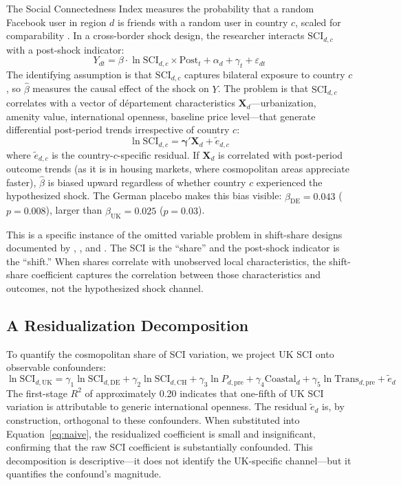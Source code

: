 \documentclass[12pt]{article}
\begin{document}
The Social Connectedness Index measures the probability that a random Facebook user in region $d$ is friends with a random user in country $c$, scaled for comparability \citep{bailey2018social}. In a cross-border shock design, the researcher interacts $\text{SCI}_{d,c}$ with a post-shock indicator:
\begin{equation}\label{eq:naive}
Y_{dt} = \beta \cdot \ln\text{SCI}_{d,c} \times \text{Post}_t + \alpha_d + \gamma_t + \varepsilon_{dt}
\end{equation}
The identifying assumption is that $\text{SCI}_{d,c}$ captures bilateral exposure to country $c$, so $\hat{\beta}$ measures the causal effect of the shock on $Y$. The problem is that $\text{SCI}_{d,c}$ correlates with a vector of d\'epartement characteristics $\mathbf{X}_d$---urbanization, amenity value, international openness, baseline price level---that generate differential post-period trends irrespective of country $c$:
\[
\ln\text{SCI}_{d,c} = \boldsymbol{\gamma}' \mathbf{X}_d + \tilde{e}_{d,c}
\]
where $\tilde{e}_{d,c}$ is the country-$c$-specific residual. If $\mathbf{X}_d$ is correlated with post-period outcome trends (as it is in housing markets, where cosmopolitan areas appreciate faster), $\hat{\beta}$ is biased upward regardless of whether country $c$ experienced the hypothesized shock. The German placebo makes this bias visible: $\hat{\beta}_{\text{DE}} = 0.043$ ($p = 0.008$), larger than $\hat{\beta}_{\text{UK}} = 0.025$ ($p = 0.03$).

This is a specific instance of the omitted variable problem in shift-share designs documented by \citet{borusyak2022quasi}, \citet{goldsmith2020bartik}, and \citet{adao2019shift}. The SCI is the ``share'' and the post-shock indicator is the ``shift.'' When shares correlate with unobserved local characteristics, the shift-share coefficient captures the correlation between those characteristics and outcomes, not the hypothesized shock channel.

\subsection{A Residualization Decomposition}

To quantify the cosmopolitan share of SCI variation, we project UK SCI onto observable confounders:
\[
\ln\text{SCI}_{d,\text{UK}} = \gamma_1 \ln\text{SCI}_{d,\text{DE}} + \gamma_2 \ln\text{SCI}_{d,\text{CH}} + \gamma_3 \ln P_{d,\text{pre}} + \gamma_4 \text{Coastal}_d + \gamma_5 \ln \text{Trans}_{d,\text{pre}} + \tilde{e}_d
\]
The first-stage $R^2$ of approximately 0.20 indicates that one-fifth of UK SCI variation is attributable to generic international openness. The residual $\tilde{e}_d$ is, by construction, orthogonal to these confounders. When substituted into Equation~\ref{eq:naive}, the residualized coefficient is small and insignificant, confirming that the raw SCI coefficient is substantially confounded. This decomposition is descriptive---it does not identify the UK-specific channel---but it quantifies the confound's magnitude.
\end{document}

